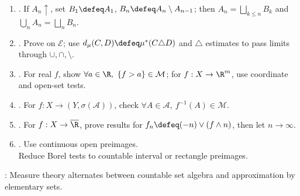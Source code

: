 \begin{method} \label{meth:measure-measurability-proof-patterns} 
\begin{enumerate}[label=(\roman*)]
\setlength{\itemsep}{0pt}
\item {}. If $A_n\uparrow$, set $B_1\defeq A_1$, $B_n\defeq A_n\setminus A_{n-1}$; then $A_n=\bigsqcup\limits_{k\leq n}B_k$ and $\bigcup\limits_nA_n=\bigsqcup\limits_nB_n$.
\item {}. Prove on $\mathcal{E}$; use $d_\mu(C,D)\defeq\mu^\ast(C\triangle D)$ and $\triangle$ estimates to pass limits through $\cup,\cap,\setminus$.
\item {}. For real $f$, show $\forall a\in\R,\ \{f>a\}\in\mathcal{M}$; for $f:X\to\R^m$, use coordinate and open-set tests.
\item {}. For $f:X\to(Y,\sigma(\mathcal{A}))$, check $\forall A\in\mathcal{A},\ f^{-1}(A)\in\mathcal{M}$.
\item {}. For $f:X\to\overline{\R}$, prove results for $f_n\defeq(-n)\vee(f\wedge n)$, then let $n\to\infty$.
\item {}. Use continuous open preimages.\\
Reduce Borel tests to countable interval or rectangle preimages.
\end{enumerate}
: Measure theory alternates between countable set algebra and approximation by elementary sets.
\end{method}
